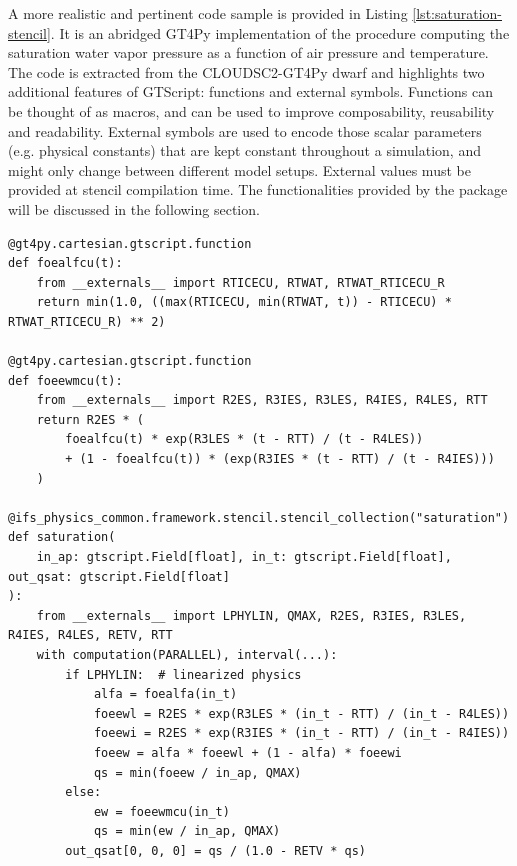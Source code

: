 \documentclass[gmd,manuscript,online]{copernicus}
\theoremstyle{theorem}
\theoremstyle{definition}
\theoremstyle{remark}
\theoremstyle{proposition}
\begin{document}
	A more realistic and pertinent code sample is provided in Listing \ref{lst:saturation-stencil}. It is an abridged GT4Py implementation of the procedure computing the saturation water vapor pressure as a function of air pressure and temperature. The code is extracted from the CLOUDSC2-GT4Py dwarf and highlights two additional features of GTScript: functions and external symbols. Functions can be thought of as macros, and can be used to improve composability, reusability and readability. External symbols are used to encode those scalar parameters (e.g. physical constants) that are kept constant throughout a simulation, and might only change between different model setups. External values must be provided at stencil compilation time. The functionalities provided by the package  will be discussed in the following section.

	\begin{listing}[t!]
		\begin{verbatim}
@gt4py.cartesian.gtscript.function
def foealfcu(t):
    from __externals__ import RTICECU, RTWAT, RTWAT_RTICECU_R
    return min(1.0, ((max(RTICECU, min(RTWAT, t)) - RTICECU) * RTWAT_RTICECU_R) ** 2)

@gt4py.cartesian.gtscript.function
def foeewmcu(t):
    from __externals__ import R2ES, R3IES, R3LES, R4IES, R4LES, RTT
    return R2ES * (
        foealfcu(t) * exp(R3LES * (t - RTT) / (t - R4LES))
        + (1 - foealfcu(t)) * (exp(R3IES * (t - RTT) / (t - R4IES)))
    )

@ifs_physics_common.framework.stencil.stencil_collection("saturation")
def saturation(
    in_ap: gtscript.Field[float], in_t: gtscript.Field[float], out_qsat: gtscript.Field[float]
):
    from __externals__ import LPHYLIN, QMAX, R2ES, R3IES, R3LES, R4IES, R4LES, RETV, RTT
    with computation(PARALLEL), interval(...):
        if LPHYLIN:  # linearized physics
            alfa = foealfa(in_t)
            foeewl = R2ES * exp(R3LES * (in_t - RTT) / (in_t - R4LES))
            foeewi = R2ES * exp(R3IES * (in_t - RTT) / (in_t - R4IES))
            foeew = alfa * foeewl + (1 - alfa) * foeewi
            qs = min(foeew / in_ap, QMAX)
        else:
            ew = foeewmcu(in_t)
            qs = min(ew / in_ap, QMAX)
        out_qsat[0, 0, 0] = qs / (1.0 - RETV * qs)
		\end{verbatim}

		\caption{GTScript (the Python-embedded DSL exposed by GT4Py) functions and stencil computing the saturation water vapor pressure given the air pressure and temperature. Abridged excerpt from the CLOUDSC2-GT4Py dwarf.}
		\label{lst:saturation-stencil}
	\end{listing}
\end{document}
